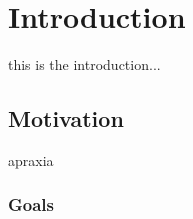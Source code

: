 \chapter{Introduction}

\label{Chapter1_introduction} 

\begin{comment}
-------------------------------------------------
1. Introduction
-------------------------------------------------
\end{comment}

this is the introduction...


\section{Motivation}
apraxia
	
\subsection{Goals}
